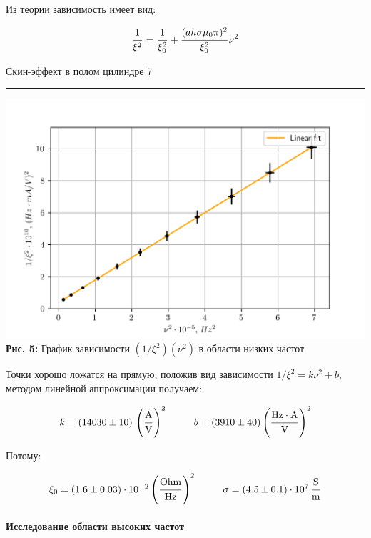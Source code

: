 \documentclass[12pt,a4paper]{scrartcl}
\begin{document}
	Из теории зависимость имеет вид:
	
	$$\dfrac{\strut 1}{\strut \xi^2} = \dfrac{\strut 1}{\strut \xi_0^2} + \dfrac{\strut (ah\sigma \mu_0 \pi)^2}{\strut \xi_0^2}\nu^2$$
	
	\newpage
	
	\begin{flushleft}
		\footnotesize{Скин-эффект в полом цилиндре} \hspace{\fill} \footnotesize{7}
		\\[-0.3cm]\noindent\rule{\textwidth}{0.3pt}
	\end{flushleft}
	
	\begin{center}
		\includegraphics[scale=1]{PIC_5.png}
		\\\textbf{Рис. 5:} График зависимости $(1/\xi^2)(\nu^2)$ в области низких частот
	\end{center}
	
	Точки хорошо ложатся на прямую, положив вид зависимости $1/\xi^2 = k\nu^2 + b$, методом линейной аппроксимации получаем:
	
	$$k = (14030 \pm 10)\, \left(\dfrac{\strut \text{A}}{\strut \text{V}}\right)^2 \ \ \ \ \ \ \ \ b = (3910 \pm 40) \left(\dfrac{\strut \text{Hz} \cdot \text{A}}{\strut \text{V}}\right)^2$$
	
	Потому:
	
	$$\xi_0 = (1.6 \pm 0.03) \cdot 10^{-2} \left(\dfrac{\strut \text{Ohm}}{\strut \text{Hz}}\right)^2 \ \ \ \ \ \ \ \ \sigma = (4.5 \pm 0.1) \cdot 10^7\,\dfrac{\strut \text{S}}{\strut \text{m}}$$
	
	
	\paragraph{Исследование области высоких частот} \hfill
	
\end{document}
